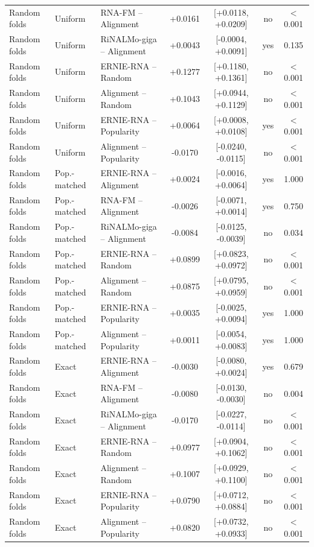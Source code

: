 {\begin{longtable}{lllcccc}
Random folds & Uniform & RNA-FM -- Alignment & +0.0161 & [+0.0118, +0.0209] & no & $<$0.001\\
Random folds & Uniform & RiNALMo-giga -- Alignment & +0.0043 & [-0.0004, +0.0091] & yes & 0.135\\
Random folds & Uniform & ERNIE-RNA -- Random & +0.1277 & [+0.1180, +0.1361] & no & $<$0.001\\
Random folds & Uniform & Alignment -- Random & +0.1043 & [+0.0944, +0.1129] & no & $<$0.001\\
Random folds & Uniform & ERNIE-RNA -- Popularity & +0.0064 & [+0.0008, +0.0108] & yes & $<$0.001\\
Random folds & Uniform & Alignment -- Popularity & -0.0170 & [-0.0240, -0.0115] & no & $<$0.001\\
Random folds & Pop.-matched & ERNIE-RNA -- Alignment & +0.0024 & [-0.0016, +0.0064] & yes & 1.000\\
Random folds & Pop.-matched & RNA-FM -- Alignment & -0.0026 & [-0.0071, +0.0014] & yes & 0.750\\
Random folds & Pop.-matched & RiNALMo-giga -- Alignment & -0.0084 & [-0.0125, -0.0039] & no & 0.034\\
Random folds & Pop.-matched & ERNIE-RNA -- Random & +0.0899 & [+0.0823, +0.0972] & no & $<$0.001\\
Random folds & Pop.-matched & Alignment -- Random & +0.0875 & [+0.0795, +0.0959] & no & $<$0.001\\
Random folds & Pop.-matched & ERNIE-RNA -- Popularity & +0.0035 & [-0.0025, +0.0094] & yes & 1.000\\
Random folds & Pop.-matched & Alignment -- Popularity & +0.0011 & [-0.0054, +0.0083] & yes & 1.000\\
Random folds & Exact & ERNIE-RNA -- Alignment & -0.0030 & [-0.0080, +0.0024] & yes & 0.679\\
Random folds & Exact & RNA-FM -- Alignment & -0.0080 & [-0.0130, -0.0030] & no & 0.004\\
Random folds & Exact & RiNALMo-giga -- Alignment & -0.0170 & [-0.0227, -0.0114] & no & $<$0.001\\
Random folds & Exact & ERNIE-RNA -- Random & +0.0977 & [+0.0904, +0.1062] & no & $<$0.001\\
Random folds & Exact & Alignment -- Random & +0.1007 & [+0.0929, +0.1100] & no & $<$0.001\\
Random folds & Exact & ERNIE-RNA -- Popularity & +0.0790 & [+0.0712, +0.0884] & no & $<$0.001\\
Random folds & Exact & Alignment -- Popularity & +0.0820 & [+0.0732, +0.0933] & no & $<$0.001\\

\end{longtable}}
